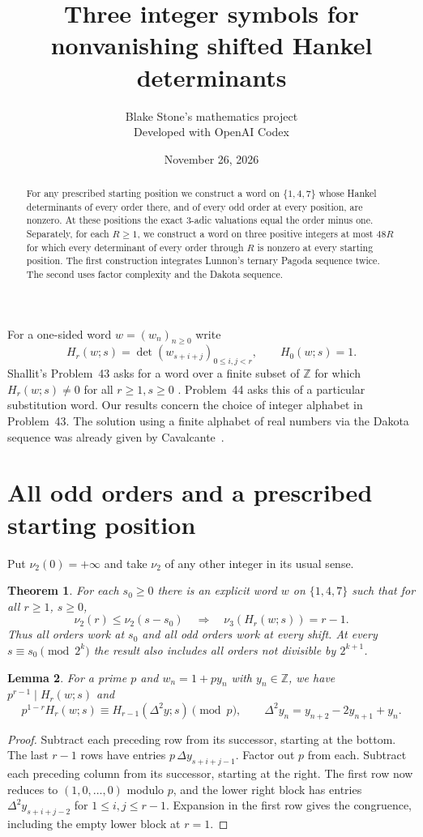 \documentclass[11pt]{article}
\title{Three integer symbols for nonvanishing shifted Hankel determinants}
\author{Blake Stone's mathematics project\\ \small Developed with OpenAI Codex}
\date{November 26, 2026}
\newtheorem{theorem}{Theorem}
\newtheorem{lemma}[theorem]{Lemma}
\newcommand{\Z}{\mathbb Z}
\begin{document}
\maketitle
\begin{abstract}
For any prescribed starting position we construct a word on $\{1,4,7\}$ whose Hankel determinants of every order there, and of every odd order at every position, are nonzero. At these positions the exact $3$-adic valuations equal the order minus one. Separately, for each $R\ge1$, we construct a word on three positive integers at most $48R$ for which every determinant of every order through $R$ is nonzero at every starting position. The first construction integrates Lunnon's ternary Pagoda sequence twice. The second uses factor complexity and the Dakota sequence.
\end{abstract}

For a one-sided word $w=(w_n)_{n\ge0}$ write
\[
 H_r(w;s)=\det(w_{s+i+j})_{0\le i,j<r},\qquad H_0(w;s)=1 .
\]
Shallit's Problem~43 asks for a word over a finite subset of $\Z$ for which $H_r(w;s)\ne0$ for all $r\ge1,s\ge0$ \cite{shallit}. Problem~44 asks this of a particular substitution word. Our results concern the choice of integer alphabet in Problem~43. The solution using a finite alphabet of real numbers via the Dakota sequence was already given by Cavalcante~\cite{dakcert}.

\section{All odd orders and a prescribed starting position}
Put $\nu_2(0)=+\infty$ and take $\nu_2$ of any other integer in its usual sense.
\begin{theorem}\label{thm}
For each $s_0\ge0$ there is an explicit word $w$ on $\{1,4,7\}$ such that for all $r\ge1$, $s\ge0$,
\[
 \nu_2(r)\le\nu_2(s-s_0)
 \quad\Longrightarrow\quad
 \nu_3(H_r(w;s))=r-1 .
\]
Thus all orders work at $s_0$ and all odd orders work at every shift. At every $s\equiv s_0\pmod{2^k}$ the result also includes all orders not divisible by $2^{k+1}$.
\end{theorem}

\begin{lemma}\label{difference}
For a prime $p$ and $w_n=1+p y_n$ with $y_n\in\Z$, we have $p^{r-1}\mid H_r(w;s)$ and
\[
 p^{1-r}H_r(w;s)\equiv H_{r-1}(\Delta^2 y;s)\pmod{p},
 \qquad \Delta^2y_n=y_{n+2}-2y_{n+1}+y_n .
\]
\end{lemma}
\begin{proof}
Subtract each preceding row from its successor, starting at the bottom. The last $r-1$ rows have entries $p\,\Delta y_{s+i+j-1}$. Factor out $p$ from each. Subtract each preceding column from its successor, starting at the right. The first row now reduces to $(1,0,\ldots,0)$ modulo $p$, and the lower right block has entries $\Delta^2 y_{s+i+j-2}$ for $1\le i,j\le r-1$. Expansion in the first row gives the congruence, including the empty lower block at $r=1$.
\end{proof}
\end{document}
